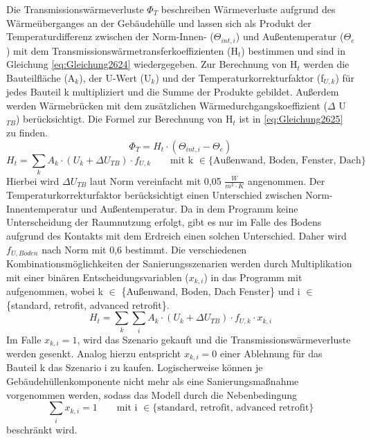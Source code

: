 Die Transmissionswärmeverluste \(\Phi_T\) beschreiben Wärmeverluste aufgrund des Wärmeüberganges an der Gebäudehülle und lassen sich als Produkt der Temperaturdifferenz zwischen der Norm-Innen- (\(\Theta_{int, i}\)) und Außentemperatur (\(\Theta_e\)) mit dem Transmissionswärmetransferkoeffizienten (H\(_t\)) bestimmen und sind in Gleichung \ref{eq:Gleichung2624} wiedergegeben.
Zur Berechnung von H\(_t\) werden die Bauteilfläche (A\(_k\)), der U-Wert (U\(_k\)) und der Temperaturkorrekturfaktor (f\(_{U,k}\)) für jedes Bauteil k multipliziert und die Summe der Produkte gebildet.
Außerdem werden Wärmebrücken mit dem zusätzlichen Wärmedurchgangskoeffizient (\(\Delta\) U\(_{TB}\)) berücksichtigt.
Die Formel zur Berechnung von H\(_t\) ist in \ref{eq:Gleichung2625} zu finden.
\begin{equation}
\label{eq:Gleichung2624}
\Phi_T = H_t \cdot (\Theta_{int, i} - \Theta_e)
\end{equation}
\begin{equation}
\label{eq:Gleichung2625}
H_t = \sum_{k} A_k \cdot (U_k + \Delta U_{TB}) \cdot f_{U,k} \qquad \text{mit k }\in \{\text{Außenwand, Boden, Fenster, Dach}\}
\end{equation}
Hierbei wird \(\Delta U_{TB}\) laut Norm vereinfacht mit 0,05 \(\frac{W}{m^2\cdot K}\) angenommen.
Der Temperaturkorrekturfaktor berücksichtigt einen Unterschied zwischen Norm-Innentemperatur und Außentemperatur.
Da in dem Programm keine Unterscheidung der Raumnutzung erfolgt, gibt es nur im Falle des Bodens aufgrund des Kontakts mit dem Erdreich einen solchen Unterschied.
Daher wird \(f_{U, Boden}\) nach Norm mit 0,6 bestimmt.
Die verschiedenen Kombinationsmöglichkeiten der Sanierungsszenarien werden durch Multiplikation mit einer binären Entscheidungsvariablen (\(x_{k, i}\)) in das Programm mit aufgenommen, wobei k \(\in\) \{Außenwand, Boden, Dach Fenster\} und i \(\in\) \{standard, retrofit, advanced retrofit\}.
\begin{equation}
\label{eq:Gleichung2626}
H_t = \sum_{k} \sum_{i} A_k \cdot (U_k + \Delta U_{TB}) \cdot f_{U,k} \cdot x_{k, i}
\end{equation}
Im Falle \(x_{k, i} = 1\), wird das Szenario gekauft und die Transmissionswärmeverluste werden gesenkt.
Analog hierzu entspricht \(x_{k, i} = 0\) einer Ablehnung für das Bauteil k das Szenario i zu kaufen.
Logischerweise können je Gebäudehüllenkomponente nicht mehr als eine Sanierungsmaßnahme vorgenommen werden, sodass das Modell durch die Nebenbedingung 
\begin{equation}
\label{eq:Gleichung2627}
\sum_{i} x_{k, i} = 1 \qquad \text{mit i } \in \{\text{standard, retrofit, advanced retrofit}\}
\end{equation}
beschränkt wird.

